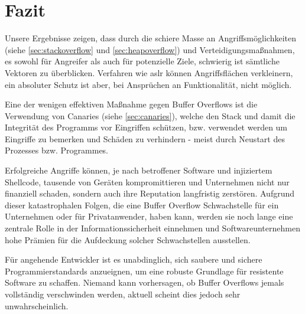 \pagebreak

\section{Fazit}
Unsere Ergebnisse zeigen, dass durch die schiere Masse an Angriffsmöglichkeiten (siehe \autoref{sec:stackoverflow} und \ref*{sec:heapoverflow})
und Verteidigungsmaßnahmen, 
es sowohl für Angreifer als auch für potenzielle Ziele, schwierig ist sämtliche Vektoren zu überblicken. 
Verfahren wie \gls{aslr} können Angriffsflächen verkleinern, ein absoluter Schutz ist aber, bei Ansprüchen an Funktionalität, nicht möglich.

Eine der wenigen effektiven Maßnahme gegen Buffer Overflows ist die Verwendung von Canaries (siehe \autoref{sec:canaries}),
welche den Stack und damit die Integrität des Programms vor Eingriffen schützen, bzw.
verwendet werden um Eingriffe zu bemerken und Schäden zu verhindern - meist durch Neustart
des Prozesses bzw. Programmes.

Erfolgreiche Angriffe können, je nach betroffener Software und injiziertem Shellcode, tausende von Geräten kompromittieren und
Unternehmen nicht nur finanziell schaden, sondern auch ihre Reputation langfristig zerstören. 
Aufgrund dieser katastrophalen Folgen, die eine Buffer Overflow Schwachstelle für ein Unternehmen oder für Privatanwender, 
haben kann, werden sie noch lange eine zentrale Rolle in der Informationssicherheit einnehmen und 
Softwareunternehmen hohe Prämien für die Aufdeckung solcher Schwachstellen ausstellen. 

Für angehende Entwickler ist es unabdinglich, sich saubere und sichere Programmierstandards anzueignen, um eine robuste Grundlage für resistente Software zu schaffen. 
Niemand kann vorhersagen, ob Buffer Overflows jemals vollständig verschwinden werden, aktuell scheint dies jedoch sehr unwahrscheinlich.

























